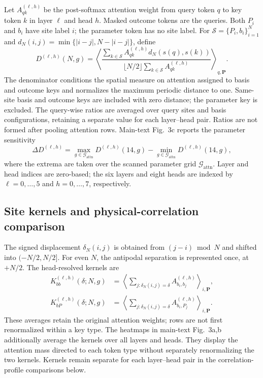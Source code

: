 \documentclass[11pt,a4paper]{article}
\newcommand{\subhead}[1]{\subsection*{#1}}
\begin{document}
Let $A^{(\ell,h)}_{qk}$ be the post-softmax attention weight from query
token $q$ to key token $k$ in layer $\ell$ and head $h$. Masked outcome
tokens are the queries. Both $P_i$ and $b_i$ have site label $i$;
the parameter token has no site label. For
$\mathcal{S}=\{P_i,b_i\}_{i=1}^{N}$ and
$d_N(i,j)=\min\{|i-j|,N-|i-j|\}$, define
\begin{equation}
D^{(\ell,h)}(N,g)=\left\langle
\frac{\sum_{k\in\mathcal{S}}A^{(\ell,h)}_{qk}
d_N(s(q),s(k))}
{\lfloor N/2\rfloor\sum_{k\in\mathcal{S}}A^{(\ell,h)}_{qk}}
\right\rangle_{q,\mathbf{P}}.
\label{supp:eq:attention_distance}
\end{equation}
The denominator conditions the spatial measure on attention assigned to
basis and outcome keys and normalizes the maximum periodic distance to
one. Same-site basis and outcome keys are included with zero distance;
the parameter key is excluded. The query-wise ratios are averaged over
query sites and basis configurations, retaining a separate value for each
layer--head pair. Ratios are not formed after pooling attention rows.
Main-text Fig.~3c reports the parameter sensitivity
\begin{equation}
\Delta D^{(\ell,h)}
=\max_{g\in\mathcal{G}_{\mathrm{attn}}}D^{(\ell,h)}(14,g)
-\min_{g\in\mathcal{G}_{\mathrm{attn}}}D^{(\ell,h)}(14,g),
\label{supp:eq:delta_distance}
\end{equation}
where the extrema are taken over the scanned parameter grid
$\mathcal{G}_{\mathrm{attn}}$. Layer and head indices are zero-based;
the six layers and eight heads are indexed by $\ell=0,\ldots,5$ and
$h=0,\ldots,7$, respectively.

\subhead{Site kernels and physical-correlation comparison}
The signed displacement $\delta_N(i,j)$ is obtained from $(j-i)\bmod N$
and shifted into $(-N/2,N/2]$. For even $N$, the antipodal separation is
represented once, at $+N/2$. The head-resolved kernels are
\begin{equation}
\begin{split}
K^{(\ell,h)}_{bb}(\delta;N,g)
&=\left\langle\sum_{j:\delta_N(i,j)=\delta}
A^{(\ell,h)}_{b_i,b_j}\right\rangle_{i,\mathbf{P}},\\
K^{(\ell,h)}_{bP}(\delta;N,g)
&=\left\langle\sum_{j:\delta_N(i,j)=\delta}
A^{(\ell,h)}_{b_i,P_j}\right\rangle_{i,\mathbf{P}}.
\end{split}
\label{supp:eq:attention_kernels}
\end{equation}
These averages retain the original attention weights; rows are not first
renormalized within a key type. The heatmaps in main-text Fig.~3a,b
additionally average the kernels over all layers and heads. They display
the attention mass directed to each token type without separately
renormalizing the two kernels. Kernels remain separate for each
layer--head pair in the correlation-profile comparisons below.
\end{document}
